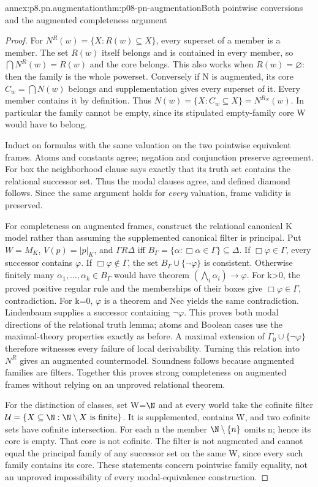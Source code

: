 \begin{annexitem}{annex:p8.pn.augmentation}{thm:p08-pn-augmentation}{Both pointwise conversions and the augmented completeness argument}
\begin{proof}
For \(N^R(w)=\{X:R(w)\subseteq X\}\), every superset of
a member is a member. The set \(R(w)\) itself belongs and is
contained in every member, so \(\bigcap N^R(w)=R(w)\) and
the core belongs. This also works when \(R(w)=\varnothing\):
then the family is the whole powerset. Conversely if N is augmented,
its core \(C_w=\bigcap N(w)\) belongs and supplementation
gives every superset of it. Every member contains it by definition.
Thus \(N(w)=\{X:C_w\subseteq X\}=N^{R_N}(w)\).
In particular the family cannot be empty, since its stipulated
empty-family core W would have to belong.

Induct on formulas with the same valuation on the two pointwise
equivalent frames. Atoms and constants agree; negation and conjunction
preserve agreement. For box the neighborhood clause says exactly
that its truth set contains the relational successor set. Thus the
modal clauses agree, and defined diamond follows. Since the same
argument holds for \emph{every} valuation, frame validity is preserved.

For completeness on augmented frames, construct the relational
canonical K model rather than assuming the supplemented canonical
filter is principal. Put \(W=M_K\), \(V(p)=|p|_K\), and
\(\Gamma R\Delta\) iff
\(B_\Gamma=\{\alpha:\Box\alpha\in\Gamma\}\subseteq\Delta\).
If \(\Box\varphi\in\Gamma\), every successor contains
\(\varphi\). If \(\Box\varphi\notin\Gamma\), the set
\(B_\Gamma\cup\{\neg\varphi\}\) is consistent. Otherwise
finitely many \(\alpha_1,\ldots,\alpha_k\in B_\Gamma\)
would have theorem \((\bigwedge_i\alpha_i)\to\varphi\).
For k>0, the proved positive regular rule and the memberships of
their boxes give \(\Box\varphi\in\Gamma\), contradiction.
For k=0, \(\varphi\) is a theorem and Nec yields the same
contradiction. Lindenbaum supplies a successor containing
\(\neg\varphi\). This proves both modal directions of the
relational truth lemma; atoms and Boolean cases use the maximal-theory
properties exactly as before. A maximal extension of
\(\Gamma_0\cup\{\neg\varphi\}\) therefore witnesses every
failure of local derivability. Turning this relation into \(N^R\)
gives an augmented countermodel. Soundness follows because augmented
families are filters. Together this proves strong completeness on
augmented frames without relying on an unproved relational theorem.

For the distinction of classes, set W=\(\N\) and at every
world take the cofinite filter
\(\mathcal U=\{X\subseteq\N:\N\setminus X\text{ is finite}\}\).
It is supplemented, contains W, and two cofinite sets have cofinite
intersection. For each n the member \(\N\setminus\{n\}\)
omits n; hence its core is empty. That core is not cofinite.
The filter is not augmented and cannot equal the principal family
of any successor set on the same W, since every such family contains
its core. These statements concern pointwise family equality,
not an unproved impossibility of every modal-equivalence construction.
\end{proof}
\end{annexitem}

